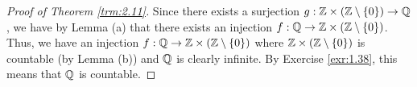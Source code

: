 \documentclass[../main.tex]{subfiles}
\begin{document}
\begin{theorem}
\begin{proof}[Proof of Theorem \ref{trm:2.11}]
        Since there exists a surjection $g:\mathbb{Z}\times(\mathbb{Z}\setminus\{0\})\to\mathbb{Q}$, we have by Lemma (a) that there exists an injection $f:\mathbb{Q}\to\mathbb{Z}\times(\mathbb{Z}\setminus\{0\})$. Thus, we have an injection $f:\mathbb{Q}\to\mathbb{Z}\times(\mathbb{Z}\setminus\{0\})$ where $\mathbb{Z}\times(\mathbb{Z}\setminus\{0\})$ is countable (by Lemma (b)) and $\mathbb{Q}$ is clearly infinite. By Exercise \ref{exr:1.38}, this means that $\mathbb{Q}$ is countable.
    \end{proof}
\end{theorem}
\end{document}
